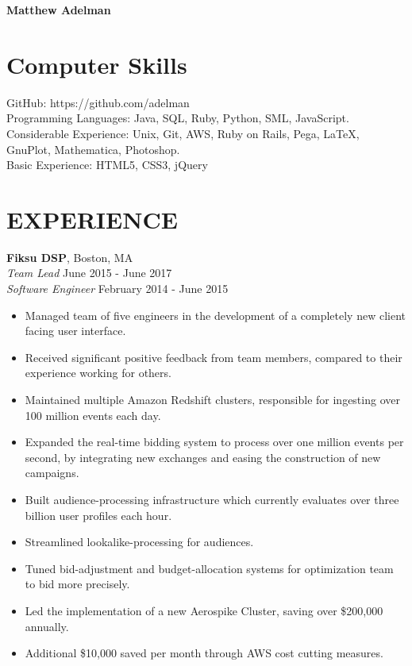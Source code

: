 \documentclass[11pt]{res} %
\begin{document}
{\bf\Large Matthew Adelman}

\address{27 Warner Street $\bullet$ Apt. \#2 $\bullet$ Somerville, MA 02144 \\
        (201) 323-2719 $\bullet$ mxadelman@gmail.com}

\address{}

\begin{resume}

\section{Computer Skills}
GitHub: https://github.com/adelman\\
Programming Languages: Java, SQL, Ruby, Python, SML, JavaScript.\\
Considerable Experience: Unix, Git, AWS, Ruby on Rails, Pega, \LaTeX, GnuPlot,
Mathematica, Photoshop.\\
Basic Experience: HTML5, CSS3, jQuery

\section{EXPERIENCE}
{\bf Fiksu DSP}, Boston, MA\\
{\it Team Lead} \hfill June 2015 - June 2017 \\
{\it Software Engineer} \hfill February 2014 - June 2015\!

\vspace{0.01in} %
   \begin{itemize} \itemsep -2pt  %
   \item Managed team of five engineers in the development of a completely new
     client facing user interface.
   \item Received significant positive feedback from team members, compared to
     their experience working for others.
   \item Maintained multiple Amazon Redshift clusters, responsible for ingesting
     over 100 million events each day.
   \item Expanded the real-time bidding system to process over one million
     events per second, by integrating new exchanges and easing the construction
     of new campaigns.
   \item Built audience-processing infrastructure which
     currently evaluates over three billion user profiles each hour.
   \item Streamlined lookalike-processing for audiences.
   \item Tuned bid-adjustment and budget-allocation systems for
     optimization team to bid more precisely.
   \item Led the implementation of a new Aerospike Cluster, saving over
     \$200,000 annually.
   \item Additional \$10,000 saved per month through AWS cost cutting measures.
   \end{itemize}


\end{resume}
\end{document}
